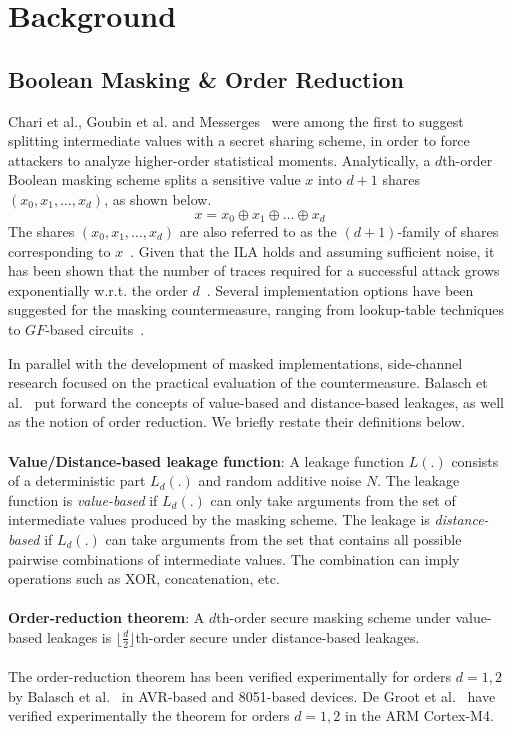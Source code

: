 \section{Background} \label{sec:background}
\subsection{Boolean Masking \& Order Reduction}
Chari et al., Goubin et al. and Messerges~\cite{DBLP:conf/crypto/ChariJRR99,DBLP:conf/ches/GoubinP99,DBLP:conf/fse/Messerges00} were among the first to suggest splitting intermediate
values with a secret sharing scheme, in order to force attackers to analyze higher-order statistical moments. Analytically, a $d$th-order Boolean masking scheme splits a sensitive value $x$ into $d+1$ shares $(x_0, x_1, \dots, x_d)$, as shown below.
\begin{equation}
x = x_0 \oplus  x_1 \oplus \dots \oplus x_d
\end{equation}
The shares $(x_0, x_1, \dots, x_d)$ are also referred to as the $(d+1)$-family of shares corresponding to $x$~\cite{DBLP:conf/ches/RivainP10}. Given that the ILA holds and assuming sufficient noise, it has been shown that the number of traces required for a successful attack grows exponentially w.r.t. the order $d$~\cite{DBLP:conf/crypto/ChariJRR99,DBLP:conf/eurocrypt/ProuffR13}. Several implementation options have been suggested for the masking countermeasure, ranging from lookup-table techniques~\cite{DBLP:conf/eurocrypt/Coron14,DBLP:conf/ctrsa/WangVGX15} to $GF$-based circuits~\cite{DBLP:conf/crypto/IshaiSW03,DBLP:conf/ches/RivainP10,cryptoeprint:2016:264}.

In parallel with the development of masked implementations, side-channel research focused on the practical evaluation of the countermeasure. Balasch et al.~\cite{DBLP:conf/cardis/BalaschGGRS14} put forward the concepts of value-based and distance-based leakages, as well as the notion of order reduction. We briefly restate their definitions below.\\\\
\textbf{Value/Distance-based leakage function}: A leakage function $L(.)$ consists of a deterministic part $L_d(.)$ and random additive noise $N$. The leakage function is \emph{value-based} if $L_d(.)$ can only take arguments from the set of intermediate values produced by the masking scheme. The leakage is \emph{distance-based} if $L_d(.)$ can  take arguments from the set that contains all possible pairwise combinations of intermediate values. The combination can imply operations such as XOR, concatenation, etc.  \\\\
\textbf{Order-reduction theorem}: A $d$th-order secure masking scheme under value-based leakages is $\lfloor \frac{d}{2} \rfloor$th-order secure under distance-based leakages.\\\\
The order-reduction theorem has been verified experimentally for orders $d=1,2$ by Balasch et al.~\cite{DBLP:conf/cardis/BalaschGGRS14} in AVR-based and 8051-based devices. De Groot et al.~\cite{DBLP:journals/iacr/GrootPPSB16} have verified experimentally the theorem for orders $d=1,2$ in the ARM Cortex-M4.
